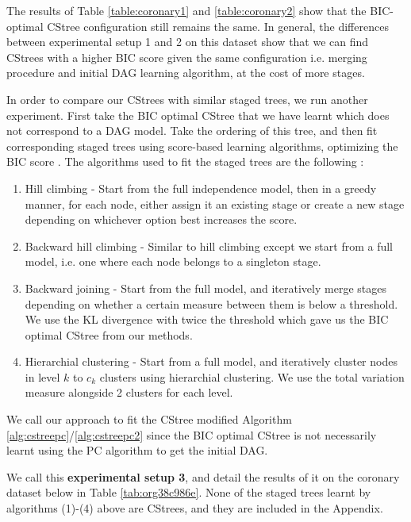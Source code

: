 \documentclass{tufte-book}
\begin{document}
The results of Table \ref{table:coronary1} and \ref{table:coronary2} show that the BIC-optimal CStree configuration still remains the same. In general, the differences between experimental setup 1 and 2 on this dataset show that we can find CStrees with a higher BIC score given the same configuration i.e. merging procedure and initial DAG learning algorithm, at the cost of more stages.




In order to compare our CStrees with similar staged trees, we run another experiment. First take the BIC optimal CStree that we have learnt which does not correspond to a DAG model. Take the ordering of this tree, and then fit corresponding staged trees using score-based learning algorithms, optimizing the BIC score \cite{carli-2020-r-packag}. The algorithms used to fit the staged trees are the following \cite{collazo-2018-chain}:


\begin{enumerate}
\item Hill climbing - Start from the full independence model, then in a greedy manner, for each node, either assign it an existing stage or create a new stage depending on whichever option best increases the score.
\item Backward hill climbing - Similar to hill climbing except we start from a full model, i.e. one where each node belongs to a singleton stage.
\item Backward joining - Start from the full model, and iteratively merge stages depending on whether a certain measure between them is below a threshold. We use the KL divergence with twice the threshold which gave us the BIC optimal CStree from our methods.
\item Hierarchial clustering - Start from a full model, and iteratively cluster nodes in level \(k\) to \(c_k\) clusters using hierarchial clustering. We use the total variation measure alongside 2 clusters for each level.
\end{enumerate}



We call our approach to fit the CStree modified Algorithm \ref{alg:cstreepc}/\ref{alg:cstreepc2} since the BIC optimal CStree is not necessarily learnt using the PC algorithm to get the initial DAG.

We call this \textbf{experimental setup 3}, and detail the results of it on the coronary dataset below in Table \ref{tab:org38c986e}. None of the staged trees learnt by algorithms (1)-(4) above are CStrees, and they are included in the Appendix.
\end{document}
